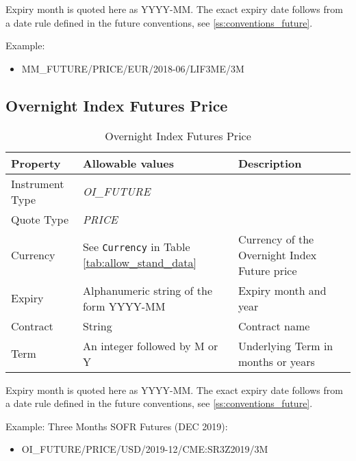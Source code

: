 Expiry month is quoted here as YYYY-MM. The exact expiry date follows from a date rule defined in the future
conventions, see \ref{ss:conventions_future}.

\medskip
Example:
\begin{itemize}
\item {MM\_FUTURE/PRICE/EUR/2018-06/LIF3ME/3M}
\end{itemize}

\subsection{Overnight Index Futures Price}\label{ss:market_data_oi_index_future_prices}

\begin{table}[H]
\centering
  \begin{tabular}{|p{3cm}|p{4.5cm}|p{7cm}|}
  \hline
    {\bf Property} & {\bf Allowable values} & {\bf Description} \\ \hline
    Instrument Type & \emph{OI\_FUTURE} & \\ \hline
    Quote Type & \emph{PRICE} & \\ \hline
    Currency & See \lstinline!Currency! in Table \ref{tab:allow_stand_data}& Currency of the Overnight Index Future price\\ \hline
    Expiry & Alphanumeric string of the form YYYY-MM & Expiry month and year\\ \hline
    Contract & String & Contract name\\ \hline
    Term & An integer followed by M or Y & Underlying Term in months or years \\ \hline
  \end{tabular}
  \caption{Overnight Index Futures Price}
  \label{tab:oifp_quote}
\end{table}

Expiry month is quoted here as YYYY-MM. The exact expiry date follows from a date rule defined in the future
conventions, see \ref{ss:conventions_future}.

\medskip
Example: Three Months SOFR Futures (DEC 2019):
\begin{itemize}
\item {OI\_FUTURE/PRICE/USD/2019-12/CME:SR3Z2019/3M}
\end{itemize}


